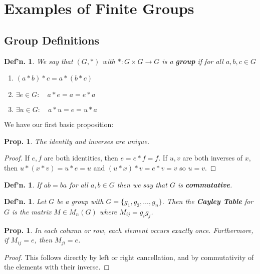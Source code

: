 \documentclass[12pt, a4paper]{book}
\newtheorem{definition}[theorem]{Def'n.}
\newtheorem{proposition}[theorem]{Prop.}
\theoremstyle{nonumberplain}
\newtheorem{proof}{Proof}
\begin{document}
\section{Examples of Finite Groups}
\subsection{Group Definitions}
\begin{definition}
    We say that $(G,*)$ with $*:G\times G\to G$ is a \textbf{group} if for all $a,b,c\in G$
    \begin{enumerate}
        \item $(a*b)*c=a*(b*c)$
        \item $\exists e\in G:\quad a*e=a=e*a$
        \item $\exists u\in G:\quad a*u=e=u*a$
    \end{enumerate}
\end{definition}
We have our first basic proposition:
\begin{proposition}
    The identity and inverses are unique.
\end{proposition}
\begin{proof}
    If $e,f$ are both identities, then $e=e*f=f$.
    If $u,v$ are both inverses of $x$, then $u*(x*v)=u*e=u$ and $(u*x)*v=e*v=v$ so $u=v$.
\end{proof}
\begin{definition}
    If $ab=ba$ for all $a,b\in G$ then we say that $G$ is \textbf{commutative}.
\end{definition}
\begin{definition}
    Let $G$ be a group with $G=\{g_1,g_2,\ldots,g_n\}$.
    Then the \textbf{Cayley Table} for $G$ is the matrix $M\in M_n(G)$ where $M_{ij}=g_ig_j$.
\end{definition}
\begin{proposition}
    In each column or row, each element occurs exactly once.
    Furthermore, if $M_{ij}=e$, then $M_{ji}=e$.
\end{proposition}
\begin{proof}
    This follows directly by left or right cancellation, and by commutativity of the elements with their inverse.
\end{proof}
\end{document}
